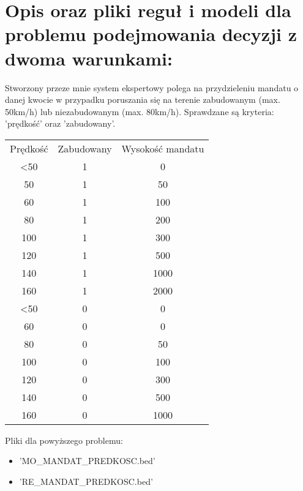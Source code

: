 \documentclass[a4paper,12pt]{article}
\theoremstyle{mytheor}
\begin{document}
\section* {Opis oraz pliki reguł i modeli dla problemu podejmowania decyzji z dwoma warunkami:}
Stworzony przeze mnie system ekspertowy polega na przydzieleniu mandatu o danej kwocie w przypadku poruszania się na terenie zabudowanym (max. 50km/h) lub niezabudowanym (max. 80km/h). Sprawdzane są kryteria: 'prędkość' oraz 'zabudowany'.
\newline
\newline
\begin{tabular}{|c|c|c|}

    Prędkość & Zabudowany & Wysokość mandatu \\
   <50&1&0 \\
   50&1&50 \\
   60&1&100 \\
   80&1&200\\
   100&1&300\\
   120&1&500\\
   140&1&1000\\
   160&1&2000\\
   <50&0&0 \\
   60&0&0 \\
   80&0&50\\
   100&0&100\\
   120&0&300\\
   140&0&500\\
   160&0&1000\\
\end{tabular}
\newline

Pliki dla powyższego problemu:
\begin{itemize}
    \item 'MO\_MANDAT\_PREDKOSC.bed'
    \item 'RE\_MANDAT\_PREDKOSC.bed'
\end{itemize}
\end{document}
